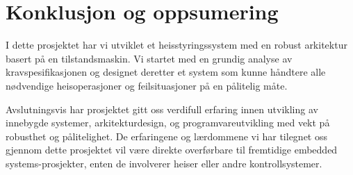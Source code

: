 \chapter{Konklusjon og oppsumering}
I dette prosjektet har vi utviklet et heisstyringssystem med en robust arkitektur basert på en tilstandsmaskin. Vi startet med en grundig analyse av kravspesifikasjonen og designet deretter et system som kunne håndtere alle nødvendige heisoperasjoner og feilsituasjoner på en pålitelig måte.

Avslutningsvis har prosjektet gitt oss verdifull erfaring innen utvikling av innebygde systemer, arkitekturdesign, og programvareutvikling med vekt på robusthet og pålitelighet. De erfaringene og lærdommene vi har tilegnet oss gjennom dette prosjektet vil være direkte overførbare til fremtidige embedded systems-prosjekter, enten de involverer heiser eller andre kontrollsystemer.
